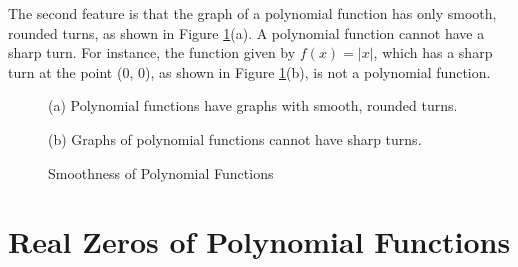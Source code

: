 The second feature is that the graph of a polynomial function has only smooth, rounded turns, as shown in Figure \ref{plot:polynomials are smooth}(a). A polynomial function cannot have a sharp turn. For instance, the function given by $f(x)=|x|$, which has a sharp turn at the point (0, 0), as shown in Figure \ref{plot:polynomials are smooth}(b), is not a polynomial function.

\begin{figure}[H]
    \centering
    \begin{multicols}{2}
    (a) Polynomial functions have graphs with smooth, rounded turns.
    (b) Graphs of polynomial functions
    cannot have sharp turns.
\end{multicols}
    \caption{Smoothness of Polynomial Functions}
    \label{plot:polynomials are smooth}
\end{figure}

\section{Real Zeros of Polynomial Functions}

